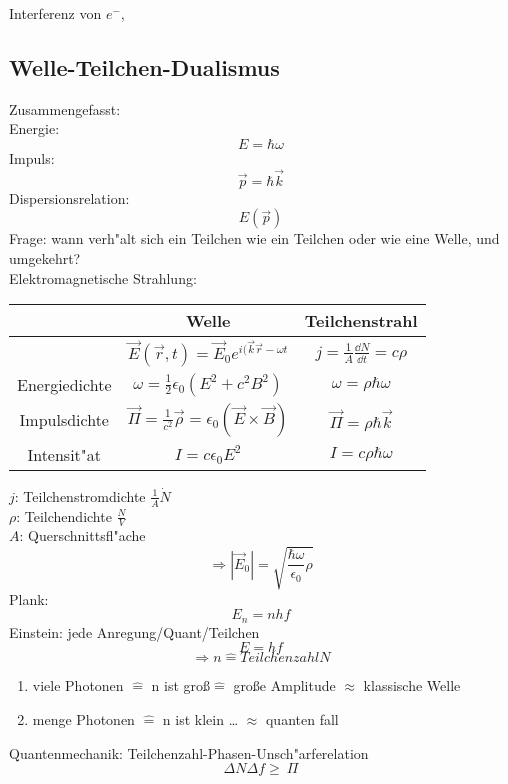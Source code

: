 Interferenz von $e^-$, 

\subsection{Welle-Teilchen-Dualismus}

Zusammengefasst:
\\
Energie: \[E=\hbar\omega\]
Impuls: \[\vec{p}=\hbar\vec{k}\]
Dispersionsrelation: \[E(\vec{p})\]
Frage: wann verh"alt sich ein Teilchen wie ein Teilchen oder wie eine Welle, und umgekehrt?\\
Elektromagnetische Strahlung:\\

\begin{center}
\begin{tabular}{ccc}
& Welle & Teilchenstrahl \\
\hline
& $\vec{E}(\vec{r},t)=\vec{E}_0e^{i(\vec{k}\vec{r}-\omega t}$ & $j=\frac{1}{A}\frac{\dd N}{\dd t}=c\rho$ \\
Energiedichte & $\omega=\frac{1}{2}\epsilon_0(E^2+c^2B^2)$ & $\omega=\rho\hbar\omega$ \\
Impulsdichte & $\vec{\Pi}=\frac{1}{c^2}\vec{\rho}=\epsilon_0(\vec{E}\times\vec{B})$ & $\vec{\Pi}=\rho\hbar\vec{k}$ \\
Intensit"at & $I=c\epsilon_0E^2$ & $I=c\rho\hbar\omega$\\
\end{tabular}
\end{center}

$j$: Teilchenstromdichte $\frac{1}{A}\dot{N}$\\
$\rho$: Teilchendichte $\frac{N}{V}$\\
$A$: Querschnittsfl"ache
\[\Rightarrow|\vec{E}_0|=\sqrt{\frac{\hbar\omega}{\epsilon_0}\rho}\]
Plank: \[E_n=nhf\]
Einstein: jede Anregung/Quant/Teilchen \[E=hf\]
\[\Rightarrow n\hat{=}Teilchenzahl N\]

\begin{enumerate}[1)]
\item viele Photonen $\hat{=}$ n ist gro\ss $\hat{=}$ gro\ss e Amplitude
$\approx$ klassische Welle
\item menge Photonen $\hat{=}$ n ist klein \dots
$\approx$ quanten fall
\end{enumerate}
Quantenmechanik: Teilchenzahl-Phasen-Unsch"arferelation
\[\Delta N\Delta f\geq~\Pi\]

